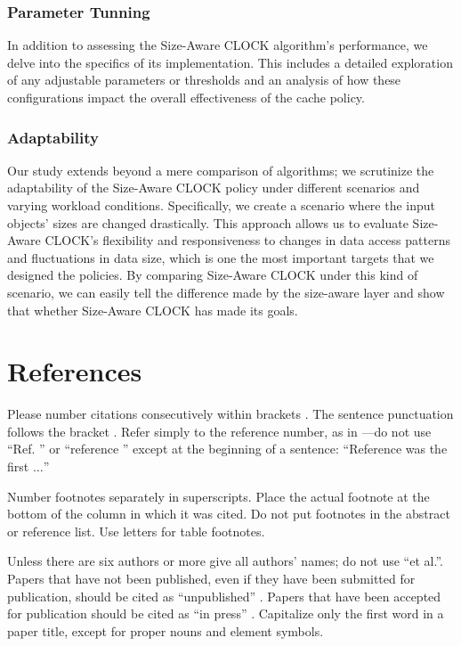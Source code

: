 \documentclass[conference]{IEEEtran}
\begin{document}
\subsubsection{Parameter Tunning}
In addition to assessing the Size-Aware CLOCK algorithm's performance, we delve into the specifics of its implementation. This includes a detailed exploration of any adjustable parameters or thresholds and an analysis of how these configurations impact the overall effectiveness of the cache policy.

\subsubsection{Adaptability}
Our study extends beyond a mere comparison of algorithms; we scrutinize the adaptability of the Size-Aware CLOCK policy under different scenarios and varying workload conditions. Specifically, we create a scenario where the input objects' sizes are changed drastically. This approach allows us to evaluate Size-Aware CLOCK's flexibility and responsiveness to changes in data access patterns and fluctuations in data size, which is one the most important targets that we designed the policies. By comparing Size-Aware CLOCK under this kind of scenario, we can easily tell the difference made by the size-aware layer and show that whether Size-Aware CLOCK has made its goals.

\section*{References}

Please number citations consecutively within brackets \cite{b1}. The
sentence punctuation follows the bracket \cite{b2}. Refer simply to the reference
number, as in \cite{b3}---do not use ``Ref. \cite{b3}'' or ``reference \cite{b3}'' except at
the beginning of a sentence: ``Reference \cite{b3} was the first $\ldots$''

Number footnotes separately in superscripts. Place the actual footnote at
the bottom of the column in which it was cited. Do not put footnotes in the
abstract or reference list. Use letters for table footnotes.

Unless there are six authors or more give all authors' names; do not use
``et al.''. Papers that have not been published, even if they have been
submitted for publication, should be cited as ``unpublished'' \cite{b4}. Papers
that have been accepted for publication should be cited as ``in press'' \cite{b5}.
Capitalize only the first word in a paper title, except for proper nouns and
element symbols.
\end{document}
